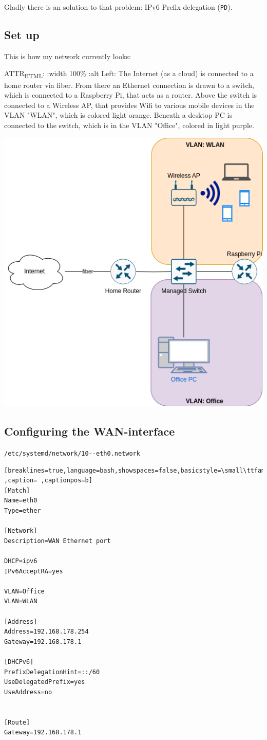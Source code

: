 \documentclass[11pt]{article}
\begin{document}
Gladly there is an solution to that problem: IPv6 Prefix delegation (\texttt{PD}).

\subsection*{Set up}
\label{sec:orgeab173b}

This is how my network currently looks:

ATTR\textsubscript{HTML}: :width 100\% :alt Left: The Internet (as a cloud) is connected to a home router via fiber. From there an Ethernet connection is drawn to a switch, which is connected to a Raspberry Pi, that acts as a router. Above the switch is connected to a Wireless AP, that provides Wifi to various mobile devices in the VLAN "WLAN", which is colored light orange. Beneath a desktop PC is connected to the switch, which is in the VLAN "Office", colored in light purple.
\begin{center}
\includegraphics[width=.65\linewidth]{img/IPv6Network.png}
\end{center}



\subsection*{Configuring the WAN-interface}
\label{sec:org9a50c01}

\texttt{/etc/systemd/network/10-{}-{}eth0.network}
\begin{lstlisting}[breaklines=true,language=bash,showspaces=false,basicstyle=\small\ttfamily,keywordstyle=\color{blue},commentstyle=\color{gray},stringstyle=\color{red},numbers=left,numberstyle=\tiny,frame=tb,language=text,label= ,caption= ,captionpos=b]
[Match]
Name=eth0
Type=ether

[Network]
Description=WAN Ethernet port

DHCP=ipv6
IPv6AcceptRA=yes

VLAN=Office
VLAN=WLAN

[Address]
Address=192.168.178.254
Gateway=192.168.178.1

[DHCPv6]
PrefixDelegationHint=::/60
UseDelegatedPrefix=yes
UseAddress=no


[Route]
Gateway=192.168.178.1
\end{lstlisting}
\end{document}
